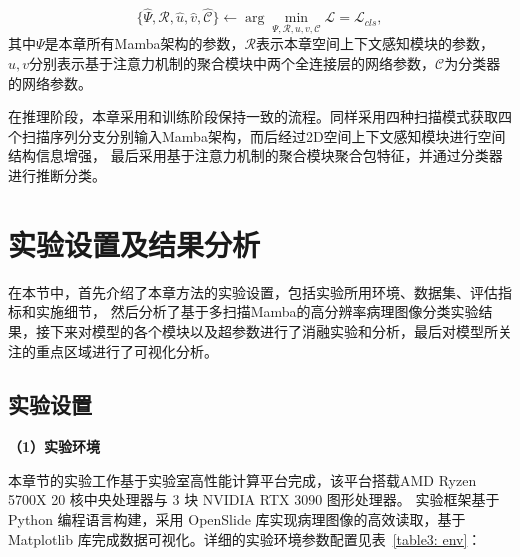 \begin{equation}
\{\hat{\Psi},\hat{\mathcal{R}},\hat{u},\hat{v},\hat{\mathcal{C}}\} \gets\arg{ \min_{\Psi,\mathcal{R},u,v,\mathcal{C}}{\mathcal{L}}}=\mathcal{L}_{cls},
\end{equation}
其中$\Psi$是本章所有Mamba架构的参数，$\mathcal{R}$表示本章空间上下文感知模块的参数，$u,v$分别表示基于注意力机制的聚合模块中两个全连接层的网络参数，$\mathcal{C}$为分类器的网络参数。

在推理阶段，本章采用和训练阶段保持一致的流程。同样采用四种扫描模式获取四个扫描序列分支分别输入Mamba架构，而后经过2D空间上下文感知模块进行空间结构信息增强，
最后采用基于注意力机制的聚合模块聚合包特征，并通过分类器进行推断分类。


\section[\hspace{-2pt}实验设置及结果分析]{{\heiti{} \hspace{-8pt}实验设置及结果分析}}\label{section3: 实验设置及结果分析}

在本节中，首先介绍了本章方法的实验设置，包括实验所用环境、数据集、评估指标和实施细节，
然后分析了基于多扫描Mamba的高分辨率病理图像分类实验结果，接下来对模型的各个模块以及超参数进行了消融实验和分析，最后对模型所关注的重点区域进行了可视化分析。

\subsection[\hspace{-2pt}实验设置]{{\heiti{} \hspace{-8pt}实验设置}}\label{section3: 实验设置}

\textbf{（1）实验环境}

本章节的实验工作基于实验室高性能计算平台完成，该平台搭载AMD Ryzen 5700X 20 核中央处理器与 3 块 NVIDIA RTX 3090 图形处理器。
实验框架基于 Python 编程语言构建，采用 OpenSlide 库实现病理图像的高效读取，基于 Matplotlib 库完成数据可视化。详细的实验环境参数配置见表~\ref{table3: env}：


